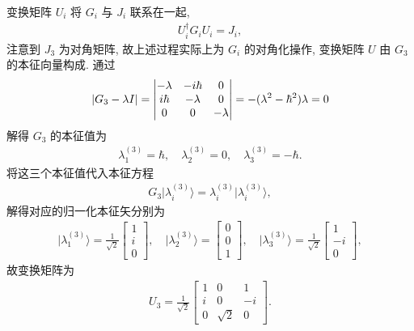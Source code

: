 \documentclass{assignment}
\begin{document}
\begin{pf}
    变换矩阵 $U_i$ 将 $G_i$ 与 $J_i$ 联系在一起,
    \begin{align}
        U_i^{\dagger}G_iU_i=J_i,
    \end{align}
    注意到 $J_3$ 为对角矩阵, 故上述过程实际上为 $G_i$ 的对角化操作, 变换矩阵 $U$ 由 $G_3$ 的本征向量构成. 通过
    \begin{align}
        \left\lvert G_3-\lambda I\right\rvert=\begin{vmatrix}
            -\lambda&-i\hbar&0\\
            i\hbar&-\lambda&0\\
            0&0&-\lambda
        \end{vmatrix}=-(\lambda^2-\hbar^2)\lambda=0
    \end{align}
    解得 $G_3$ 的本征值为
    \begin{align}
        \lambda_1^{(3)}=\hbar,\quad\lambda_2^{(3)}=0,\quad\lambda_3^{(3)}=-\hbar.
    \end{align}
    将这三个本征值代入本征方程
    \begin{align}
        G_3\lvert\lambda_i^{(3)}\rangle=\lambda_i^{(3)}\lvert\lambda_i^{(3)}\rangle,
    \end{align}
    解得对应的归一化本征矢分别为
    \begin{align}
        \lvert\lambda_1^{(3)}\rangle=\frac{1}{\sqrt{2}}\begin{bmatrix}
            1\\
            i\\
            0
        \end{bmatrix},\quad\lvert\lambda_2^{(3)}\rangle=\begin{bmatrix}
            0\\
            0\\
            1
        \end{bmatrix},\quad\lvert\lambda_3^{(3)}\rangle=\frac{1}{\sqrt{2}}\begin{bmatrix}
            1\\
            -i\\
            0
        \end{bmatrix},
    \end{align}
    故变换矩阵为
    \begin{align}
        U_3=\frac{1}{\sqrt{2}}\begin{bmatrix}
            1&0&1\\
            i&0&-i\\
            0&\sqrt{2}&0
        \end{bmatrix}.
    \end{align}


\end{pf}
\end{document}
